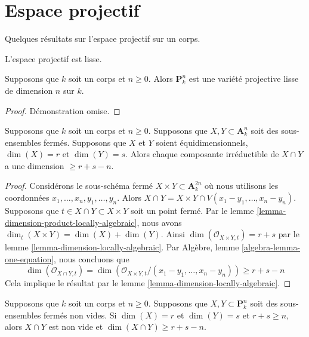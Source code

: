 \section{Espace projectif}
\label{section-projective-space}

\noindent
Quelques résultats sur l'espace projectif sur un corps.

\begin{lemma}
\label{lemma-projective-space-smooth}
\begin{slogan}
L'espace projectif est lisse.
\end{slogan}
Supposons que $k$ soit un corps et $n \geq 0$. Alors
$\mathbf{P}^n_k$ est une variété projective lisse de dimension $n$ sur $k$.
\end{lemma}

\begin{proof}
Démonstration omise.
\end{proof}

\begin{lemma}
\label{lemma-intersection-in-affine-space}
Supposons que $k$ soit un corps et $n \geq 0$. Supposons que $X, Y
\subset \mathbf{A}^n_k$ soit des sous-ensembles fermés. Supposons que $X$
et $Y$ soient équidimensionnels, $\dim(X) = r$ et $\dim(Y) = s$. Alors
chaque composante irréductible de $X \cap Y$ a une dimension $\geq r + s - n$.
\end{lemma}

\begin{proof}
Considérons le sous-schéma fermé $X \times Y \subset
\mathbf{A}^{2n}_k$ où nous utilisons les coordonnées
$x_1, \ldots, x_n, y_1, \ldots, y_n$. Alors $X \cap Y = X
\times Y \cap V(x_1 - y_1, \ldots, x_n - y_n)$. Supposons
que $t \in X \cap Y \subset X \times Y$ soit un point
fermé. Par le lemme
\ref{lemma-dimension-product-locally-algebraic}, nous avons $\dim_t(X
\times Y) = \dim(X) + \dim(Y)$. Ainsi $\dim(\mathcal{O}_{X \times Y,
t}) = r + s$ par le lemme \ref{lemma-dimension-locally-algebraic}.
Par Algèbre, lemme \ref{algebra-lemma-one-equation}, nous concluons que
$$
\dim(\mathcal{O}_{X \cap Y, t}) =
\dim(\mathcal{O}_{X \times Y, t}/(x_1 - y_1, \ldots, x_n - y_n)) \geq
r + s - n
$$
Cela implique le résultat par le lemme \ref{lemma-dimension-locally-algebraic}.
\end{proof}

\begin{lemma}
\label{lemma-intersection-in-projective-space}
Supposons que $k$ soit un corps et $n \geq 0$. Supposons que
$X, Y \subset \mathbf{P}^n_k$ soit des sous-ensembles fermés
non vides. Si $\dim(X) = r$ et $\dim(Y) = s$ et $r + s \geq n$,
alors $X \cap Y$ est non vide et $\dim(X \cap Y) \geq r + s - n$.
\end{lemma}

